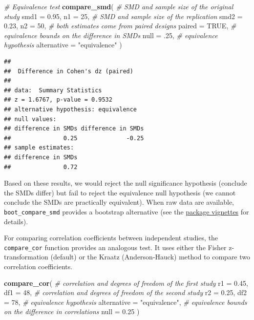 \documentclass[]{interact}
\theoremstyle{plain}%
\theoremstyle{definition}
\theoremstyle{remark}
\newenvironment{Shaded}{\begin{snugshade}}{\end{snugshade}}
\newcommand{\AttributeTok}[1]{\textcolor[rgb]{0.13,0.29,0.53}{#1}}
\newcommand{\CommentTok}[1]{\textcolor[rgb]{0.56,0.35,0.01}{\textit{#1}}}
\newcommand{\ConstantTok}[1]{\textcolor[rgb]{0.56,0.35,0.01}{#1}}
\newcommand{\DecValTok}[1]{\textcolor[rgb]{0.00,0.00,0.81}{#1}}
\newcommand{\FloatTok}[1]{\textcolor[rgb]{0.00,0.00,0.81}{#1}}
\newcommand{\FunctionTok}[1]{\textcolor[rgb]{0.13,0.29,0.53}{\textbf{#1}}}
\newcommand{\NormalTok}[1]{#1}
\newcommand{\StringTok}[1]{\textcolor[rgb]{0.31,0.60,0.02}{#1}}
\begin{document}
\begin{Shaded}
\begin{Highlighting}[]
\CommentTok{\# Equivalence test}
\FunctionTok{compare\_smd}\NormalTok{(}
  \CommentTok{\# SMD and sample size of the original study}
  \AttributeTok{smd1 =} \FloatTok{0.95}\NormalTok{,}
  \AttributeTok{n1 =} \DecValTok{25}\NormalTok{,}
  \CommentTok{\# SMD and sample size of the replication}
  \AttributeTok{smd2 =} \FloatTok{0.23}\NormalTok{,}
  \AttributeTok{n2 =} \DecValTok{50}\NormalTok{,}
  \CommentTok{\# both estimates come from paired designs}
  \AttributeTok{paired =} \ConstantTok{TRUE}\NormalTok{,}
  \CommentTok{\# equivalence bounds on the difference in SMDs}
  \AttributeTok{null =}\NormalTok{ .}\DecValTok{25}\NormalTok{,}
  \CommentTok{\# equivalence hypothesis}
  \AttributeTok{alternative =} \StringTok{"equivalence"}
\NormalTok{)}
\end{Highlighting}
\end{Shaded}

\begin{verbatim}
## 
##  Difference in Cohen's dz (paired)
## 
## data:  Summary Statistics
## z = 1.6767, p-value = 0.9532
## alternative hypothesis: equivalence
## null values:
## difference in SMDs difference in SMDs 
##               0.25              -0.25 
## sample estimates:
## difference in SMDs 
##               0.72
\end{verbatim}

Based on these results, we would reject the null significance hypothesis
(conclude the SMDs differ) but fail to reject the equivalence null
hypothesis (we cannot conclude the SMDs are practically equivalent).
When raw data are available, \texttt{boot\_compare\_smd} provides a
bootstrap alternative (see the
\href{https://aaroncaldwell.us/TOSTERpkg/articles/SMD_calcs.html\#comparing-smds}{package
vignettes} for details).

For comparing correlation coefficients between independent studies, the
\texttt{compare\_cor} function provides an analogous test. It uses
either the Fisher z-transformation (default) or the Kraatz
(Anderson-Hauck) method to compare two correlation coefficients.

\begin{Shaded}
\begin{Highlighting}[]
\FunctionTok{compare\_cor}\NormalTok{(}
  \CommentTok{\# correlation and degrees of freedom of the first study}
  \AttributeTok{r1 =} \FloatTok{0.45}\NormalTok{,}
  \AttributeTok{df1 =} \DecValTok{48}\NormalTok{,}
  \CommentTok{\# correlation and degrees of freedom of the second study}
  \AttributeTok{r2 =} \FloatTok{0.25}\NormalTok{,}
  \AttributeTok{df2 =} \DecValTok{78}\NormalTok{,}
  \CommentTok{\# equivalence hypothesis}
  \AttributeTok{alternative =} \StringTok{"equivalence"}\NormalTok{,}
  \CommentTok{\# equivalence bounds on the difference in correlations}
  \AttributeTok{null =} \FloatTok{0.25}
\NormalTok{)}
\end{Highlighting}
\end{Shaded}
\end{document}
